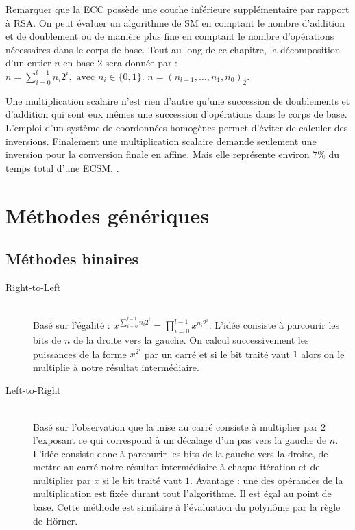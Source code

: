 Remarquer que la ECC possède une couche inférieure supplémentaire par rapport à RSA. On peut évaluer un algorithme de SM en comptant le nombre d'addition et de doublement ou de manière plus fine en comptant le nombre d'opérations nécessaires dans le corps de base.
Tout au long de ce chapitre, la décomposition d'un entier $n$ en base $2$ sera donnée par : \\ $n = \sum_{i = 0}^{l-1} n_i 2^i, \text{ avec } n_i \in \{0, 1\}$. $n = (n_{l-1}, \ldots, n_1, n_0)_2$.

Une multiplication scalaire n'est rien d'autre qu'une succession de doublements et d'addition qui sont eux mêmes une succession d'opérations dans le corps de base. L'emploi d'un système de coordonnées homogènes permet d'éviter de calculer des inversions. Finalement une multiplication scalaire demande seulement une inversion pour la conversion finale en affine. Mais elle représente environ $7\%$ du temps total d'une ECSM. .

\section{Méthodes génériques}
\subsection{Méthodes binaires}
\begin{description}
    \item[Right-to-Left] \hfill \\
    Basé sur l'égalité : $x^{\sum_{i = 0}^{l-1} n_i 2^i} = \prod_{i = 0}^{l-1} x^{n_i 2^i}$. L'idée consiste à parcourir les bits de $n$ de la droite vers la gauche. On calcul successivement les puissances de la forme $x^{2^i}$ par un carré et si le bit traité vaut $1$ alors on le multiplie à notre résultat intermédiaire.
    \item[Left-to-Right] \hfill \\
    Basé sur l'observation que la mise au carré consiste à multiplier par $2$ l'exposant ce qui correspond à un décalage d'un pas vers la gauche de $n$. L'idée consiste donc à parcourir les bits de la gauche vers la droite, de mettre au carré notre résultat intermédiaire à chaque itération et de multiplier par $x$ si le bit traité vaut $1$.
    Avantage : une des opérandes de la multiplication est fixée durant tout l'algorithme. Il est égal au point de base. Cette méthode est similaire à l'évaluation du polynôme par la règle de Hörner.
\end{description}

